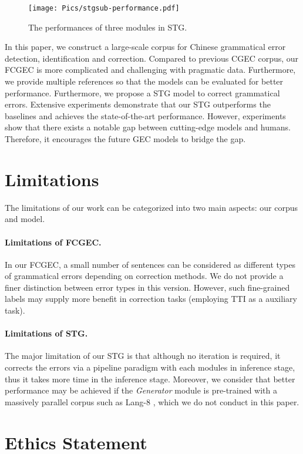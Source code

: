 \documentclass[11pt]{article}
\begin{document}
\begin{figure}[t]
	\centering
	\texttt{[image: Pics/stgsub-performance.pdf]} 
	\caption{The performances of three modules in STG.}
	\label{fig:stg-sub-performance}
\end{figure}
 
In this paper, we construct a large-scale corpus for Chinese grammatical error detection, identification and correction. Compared to previous CGEC corpus, our FCGEC is more complicated and challenging with pragmatic data. Furthermore, we provide multiple references so that the models can be evaluated for better performance. Furthermore, we propose a STG model to correct grammatical errors. Extensive experiments demonstrate that our STG outperforms the baselines and achieves the state-of-the-art performance. However, experiments show that there exists a notable gap between cutting-edge models and humans. Therefore, it encourages the future GEC models to bridge the gap. 
\section*{Limitations}
The limitations of our work can be categorized into two main aspects: our corpus and model.

\paragraph{Limitations of FCGEC.} In our FCGEC, a small number of sentences can be considered as different types of grammatical errors depending on correction methods. We do not provide a finer distinction between error types in this version. However, such fine-grained labels may supply more benefit in correction tasks (employing TTI as a auxiliary task). 

\paragraph{Limitations of STG.} The major limitation of our STG is that although no iteration is required, it corrects the errors via a pipeline paradigm with each modules in inference stage, thus it takes more time in the inference stage. Moreover, we consider that better performance may be achieved if the \emph{Generator} module is pre-trained with a massively parallel corpus such as Lang-8 \cite{zhao2018overview}, which we do not conduct in this paper. 
\section*{Ethics Statement}
\end{document}
